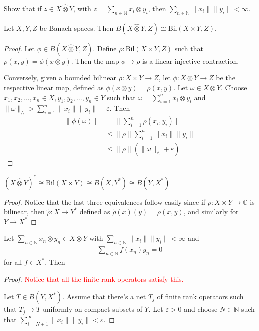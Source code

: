 

Show that if $z \in X \hat{\otimes} Y$, with $z = \sum_{n \in
\mathbb{N}} x_i \otimes y_i$, then $\sum_{n \in \mathbb{N}}
\|x_i\|\|y_i\| < \infty$.

\begin{proposition}
  Let $X, Y, Z$ be Banach spaces. Then $B(X \hat{\otimes} Y , Z)
  \cong \textrm{Bil}(X \times Y , Z)$.
\end{proposition}
\begin{proof}
  Let $\phi \in B(X \hat{\otimes} Y , Z)$. Define $\rho:
  \textrm{Bil}(X \times Y, Z)$ such that $\rho(x, y) = \phi(x \otimes
  y)$. Then the map $\phi \to \rho$ is a linear injective contraction.

  Conversely, given a bounded bilinear $ \rho: X \times Y \to Z$, let
  $\phi: X \otimes Y \to Z$ be the respective linear map, defined as
  $\phi(x \otimes y) = \rho(x, y)$. Let $\omega \in X \otimes Y$.
  Choose $x_1 , x_2 , \ldots , x_n \in X, y_1 , y_2 , \ldots , y_n
  \in Y$ such that $\omega = \sum_{i = 1}^{n} x_i \otimes y_i$ and
  $\|\omega\|_{\wedge} > \sum_{i = 1}^{n}  \|x_i\|\|y_i\| - \varepsilon$. Then
  \begin{align*}
    \|\phi(\omega)\| &= \|\sum_{i = 1}^{n} \rho(x_i, y_i)\| \\
    &\le \|\rho\| \sum_{i = 1}^{n} \|x_i\|\|y_i\| \\
    &\le \|\rho\|(\|\omega\|_{\wedge} + \varepsilon)
  \end{align*}
\end{proof}

\begin{corollary}
  $(X \hat{\otimes} Y)^* \cong \textrm{Bil}(X \times Y) \cong B(X,
  Y^*) \cong B(Y, X^*)$
\end{corollary}
\begin{proof}
  Notice that the last three equivalences follow easily since if
  $\rho: X \times Y \to \mathbb{C}$ is bilinear, then $\tilde{ \rho}:
  X \to Y^*$ defined as $\tilde{ \rho}(x)(y) = \rho(x, y)$, and
  similarly for $Y \to X^*$
\end{proof}

\begin{proposition}
  Let $\sum_{n \in \mathbb{N}} x_n \otimes y_n \in X \otimes Y$ with
  $ \sum_{n \in \mathbb{N}} \|x_i\|\|y_i\| < \infty$ and
  \begin{align*}
    \sum_{n \in \mathbb{N}} f(x_n)y_n = 0
  \end{align*}
  for all $f \in X^*$. Then
\end{proposition}
\begin{proof}
  \textcolor{red}{Notice that all the finite rank operators satisfy this.}

  Let $T \in B(Y, X^*)$. Assume that there's a net $T_j$ of finite
  rank operators such that $T_j \to T$ uniformly on compact subsets
  of $Y$. Let $\varepsilon > 0$ and choose $N \in \mathbb{N}$ such
  that $\sum_{i = N+1}^{\infty} \|x_i\|\|y_i\| < \varepsilon$.
\end{proof}
